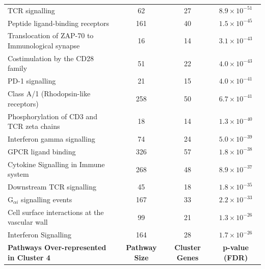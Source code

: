 \begin{table}[!hp]
{\begin{threeparttable}
\begin{tabular}{lccc}
  \rowcolor{Cluster_Orange!30} 
  TCR signalling &  62 &  27 & $8.9 \times 10^{-51}$ \\
  \rowcolor{Cluster_Orange!20} 
  Peptide ligand-binding receptors & 161 &  40 & $1.5 \times 10^{-45}$ \\
  \rowcolor{Cluster_Orange!30} 
  Translocation of ZAP-70 to Immunological synapse &  16 &  14 & $3.1 \times 10^{-43}$ \\
  \rowcolor{Cluster_Orange!20} 
  Costimulation by the CD28 family &  51 &  22 & $4.0 \times 10^{-43}$ \\
  \rowcolor{Cluster_Orange!30} 
  PD-1 signalling &  21 &  15 & $4.0 \times 10^{-41}$ \\
  \rowcolor{Cluster_Orange!20} 
  Class A/1 (Rhodopsin-like receptors) & 258 &  50 & $6.7 \times 10^{-41}$ \\
  \rowcolor{Cluster_Orange!30} 
  Phosphorylation of CD3 and TCR zeta chains &  18 &  14 & $1.3 \times 10^{-40}$ \\
  \rowcolor{Cluster_Orange!20} 
  Interferon gamma signalling &  74 &  24 & $5.0 \times 10^{-39}$ \\
  \rowcolor{Cluster_Orange!30} 
  GPCR ligand binding & 326 &  57 & $1.8 \times 10^{-38}$ \\
  \rowcolor{Cluster_Orange!20} 
  Cytokine Signalling in Immune system & 268 &  48 & $8.9 \times 10^{-37}$ \\
  \rowcolor{Cluster_Orange!30} 
  Downstream TCR signalling &  45 &  18 & $1.8 \times 10^{-35}$ \\
  \rowcolor{Cluster_Orange!20} 
  G$_{\alpha i}$ signalling events & 167 &  33 & $2.2 \times 10^{-33}$ \\
  \rowcolor{Cluster_Orange!30} 
  Cell surface interactions at the vascular wall &  99 &  21 & $1.3 \times 10^{-26}$ \\
  \rowcolor{Cluster_Orange!20} 
  Interferon Signalling & 164 &  28 & $1.7 \times 10^{-26}$ \\
   \hline
  \cellcolor{white} \large{\textbf{Pathways Over-represented in Cluster 4}} & \large{\textbf{Pathway Size}} & \large{\textbf{Cluster Genes}} & \large{\textbf{p-value (FDR)}} \\ %

\end{tabular}
\end{threeparttable}}
\end{table}
